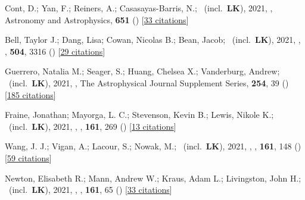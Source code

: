 \item[{\color{numcolor}\scriptsize55}] Cont, D.; Yan, F.; Reiners, A.; Casasayas-Barris, N.; \etal\ (incl.\ \textbf{LK}), 2021, , Astronomy and Astrophysics, \textbf{651} () [\href{https://ui.adsabs.harvard.edu/abs/2021A&A...651A..33C}{33 citations}]

\item[{\color{numcolor}\scriptsize54}] Bell, Taylor J.; Dang, Lisa; Cowan, Nicolas B.; Bean, Jacob; \etal\ (incl.\ \textbf{LK}), 2021, , \mnras, \textbf{504}, 3316 () [\href{https://ui.adsabs.harvard.edu/abs/2021MNRAS.504.3316B}{29 citations}]

\item[{\color{numcolor}\scriptsize53}] Guerrero, Natalia M.; Seager, S.; Huang, Chelsea X.; Vanderburg, Andrew; \etal\ (incl.\ \textbf{LK}), 2021, , The Astrophysical Journal Supplement Series, \textbf{254}, 39 () [\href{https://ui.adsabs.harvard.edu/abs/2021ApJS..254...39G}{185 citations}]

\item[{\color{numcolor}\scriptsize52}] Fraine, Jonathan; Mayorga, L. C.; Stevenson, Kevin B.; Lewis, Nikole K.; \etal\ (incl.\ \textbf{LK}), 2021, , \aj, \textbf{161}, 269 () [\href{https://ui.adsabs.harvard.edu/abs/2021AJ....161..269F}{13 citations}]

\item[{\color{numcolor}\scriptsize51}] Wang, J. J.; Vigan, A.; Lacour, S.; Nowak, M.; \etal\ (incl.\ \textbf{LK}), 2021, , \aj, \textbf{161}, 148 () [\href{https://ui.adsabs.harvard.edu/abs/2021AJ....161..148W}{59 citations}]

\item[{\color{numcolor}\scriptsize50}] Newton, Elisabeth R.; Mann, Andrew W.; Kraus, Adam L.; Livingston, John H.; \etal\ (incl.\ \textbf{LK}), 2021, , \aj, \textbf{161}, 65 () [\href{https://ui.adsabs.harvard.edu/abs/2021AJ....161...65N}{33 citations}]

